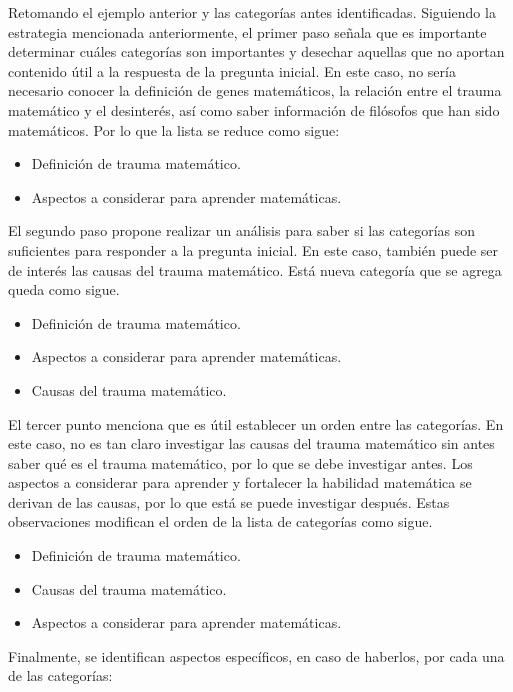 Retomando el ejemplo anterior y las categorías antes identificadas. Siguiendo la estrategia mencionada anteriormente, el primer paso señala que es importante determinar cuáles categorías son importantes y desechar aquellas que no aportan contenido útil a la respuesta de la pregunta inicial. En este caso, no sería necesario conocer la definición de genes matemáticos, la relación entre el trauma matemático y el desinterés, así como saber información de filósofos que han sido matemáticos. Por lo que la lista se reduce como sigue:

\begin{itemize}
  \item Definición de trauma matemático.
  \item Aspectos a considerar para aprender matemáticas.
\end{itemize}

El segundo paso propone realizar un análisis para saber si las categorías son suficientes para responder a la pregunta inicial. En este caso, también puede ser de interés las causas del trauma matemático. Está nueva categoría que se agrega queda como sigue.

\begin{itemize}
  \item Definición de trauma matemático.
  \item Aspectos a considerar para aprender matemáticas.
  \item Causas del trauma matemático.
\end{itemize}

El tercer punto menciona que es útil establecer un orden entre las categorías. En este caso, no es tan claro investigar las causas del trauma matemático sin antes saber qué es el trauma matemático, por lo que se debe investigar antes. Los aspectos a considerar para aprender y fortalecer la habilidad matemática se derivan de las causas, por lo que está se puede investigar después. Estas observaciones modifican el orden de la lista de categorías como sigue.

\begin{itemize}
  \item Definición de trauma matemático.
  \item Causas del trauma matemático.
  \item Aspectos a considerar para aprender matemáticas.
\end{itemize}

Finalmente, se identifican aspectos específicos, en caso de haberlos, por cada una de las categorías:


